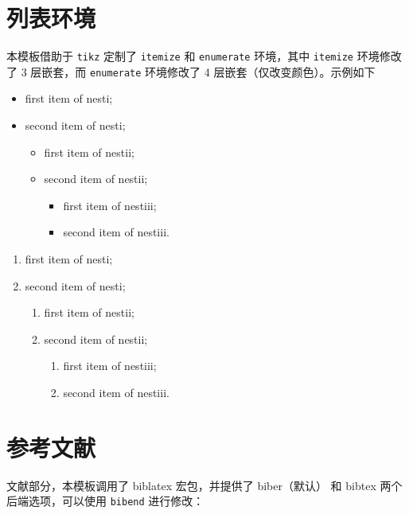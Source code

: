 \section{列表环境}
本模板借助于 \lstinline{tikz} 定制了 \lstinline{itemize} 和 \lstinline{enumerate} 环境，其中 \lstinline{itemize} 环境修改了 3 层嵌套，而 \lstinline{enumerate} 环境修改了 4 层嵌套（仅改变颜色）。示例如下\\[2ex]
\begin{minipage}[b]{0.49\textwidth}
  \begin{itemize}
    \item first item of nesti;
    \item second item of nesti;
      \begin{itemize}
        \item first item of nestii;
        \item second item of nestii;
        \begin{itemize}
          \item first item of nestiii;
          \item second item of nestiii.
        \end{itemize}   
      \end{itemize}
  \end{itemize}
\end{minipage}
\begin{minipage}[b]{0.49\textwidth}
  \begin{enumerate}
    \item first item of nesti;
    \item second item of nesti;
      \begin{enumerate}
        \item first item of nestii;
        \item second item of nestii;
        \begin{enumerate}
          \item first item of nestiii;
          \item second item of nestiii.
        \end{enumerate}   
      \end{enumerate}
  \end{enumerate}
\end{minipage}

\section{参考文献}
文献部分，本模板调用了 biblatex 宏包，并提供了 biber（默认） 和 bibtex 两个后端选项，可以使用 \lstinline{bibend} 进行修改：

